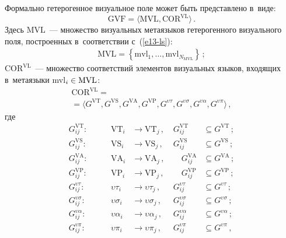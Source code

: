 \begin{multicols}{2}
  Формально гетерогенное визуальное поле может быть представлено в~виде:
  \begin{equation}
  \mathrm{GVF}=\langle \mathrm{MVL}, \mathrm{COR}^{\mathrm{VL}}\rangle\,.
  \label{e14-ls}
  \end{equation}
Здесь $\mathrm{MVL}$~--- множество визуальных метаязыков гетерогенного визуального 
поля, построенных в~соответствии с~(\ref{e13-ls}):
  \begin{gather*}
  \mathrm{MVL}=\left\{ \mathrm{mvl}_1,\ldots , \mathrm{mvl}_{N_{\mathrm{MVL}}}\right\}\,;
  \end{gather*}
  $\mathrm{COR}^{\mathrm{VL}}$~--- множество 
соответствий элементов визуальных языков, входящих в~метаязыки 
mvl$_i\hm\in \mathrm{MVL}$:
\begin{multline*}
  \mathrm{COR}^{\mathrm{VL}} ={}\\
  {}=\langle G^{\mathrm{VT}}, G^{\mathrm{VS}}, G^{\mathrm{VA}}, 
  G^{\mathrm{VP}}, G^{\upsilon\tau}, 
G^{\upsilon\sigma}, G^{\upsilon\alpha}, G^{\upsilon\pi}\rangle\,,
\end{multline*}
  где
\begin{alignat*}{3}
  G^{\mathrm{VT}}_{ij}:\ & \quad&\mathrm{VT}_i&\to \mathrm{VT}_j\,,\ &
  G^{\mathrm{VT}}_{ij}&\subseteq G^{\mathrm{VT}}\,;\\
  G_{ij}^{\mathrm{VS}}:\ & &\mathrm{VS}_i&\to \mathrm{VS}_j\,,\ &G_{ij}^{\mathrm{VS}}
 & \subseteq G^{\mathrm{VS}}\,;\\
  G_{ij}^{\mathrm{VA}}:\ &&\mathrm{VA}_i&\to \mathrm{VA}_j\,,\ &\quad G_{ij}^{\mathrm{VA}}
  &\subseteq G^{\mathrm{VA}}\,;\\
  G_{ij}^{\mathrm{VP}}:\ &&\mathrm{VP}_i&\to \mathrm{VP}_j\,,\ &\quad G_{ij}^{\mathrm{VP}}
  &\subseteq G^{\mathrm{VP}}\,;\\
  G_{ij}^{\upsilon\tau}:\ &&\upsilon\tau_i&\to \upsilon\tau_j\,,\ 
&G^{\upsilon\tau}_{ij}&\subseteq G^{\upsilon\tau}\,;\\
  G_{ij}^{\upsilon\sigma}:\ &&\upsilon\sigma_i&\to \upsilon\sigma_j\,,\ 
&G_{ij}^{\upsilon\sigma}&\subseteq G^{\upsilon\sigma}\,;\\
  G_{ij}^{\upsilon\alpha}:\ &&\upsilon\alpha_i&\to \upsilon\alpha_j\,,\ 
&G_{ij}^{\upsilon\alpha} &\subseteq G^{\upsilon\alpha}\,;\\
  G_{ij}^{\upsilon\pi}:\ &&\upsilon\pi_i&\to \upsilon\pi_j\,,\ &G_{ij}^{\upsilon\pi} 
&\subseteq G^{\upsilon\pi}\,, 
\end{alignat*}

\vspace*{-6pt}


\end{multicols}
